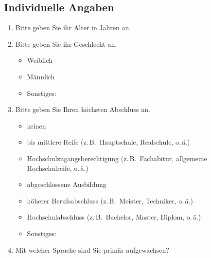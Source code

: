 
\subsection*{Individuelle Angaben}


\begin{enumerate}[resume]
\item \label{App2:IA} Bitte geben Sie ihr Alter in Jahren an.\\
	   \underline{\hspace{7.5cm}}


\item Bitte geben Sie ihr Geschlecht an.

		\begin{itemize}
		\item[\Circle] Weiblich 
        \item[\Circle] Männlich 
        \item[\Circle] Sonstiges:~\underline{\hspace{7.5cm}}
        \end{itemize}
        
        
\item Bitte geben Sie Ihren höchsten Abschluss an.

		\begin{itemize}
        \item[\Circle] keinen
		\item[\Circle] bis mittlere Reife (z.\,B.\ Hauptschule, Realschule, o.\,ä.)
        \item[\Circle] Hochschulzugangsberechtigung (z.\,B.\ Fachabitur, allgemeine Hochschulreife, o.\,ä.)
       	\item[\Circle] abgeschlossene Ausbildung
        \item[\Circle] höherer Berufsabschluss (z.\,B.\ Meister, Techniker, o.\,ä.)
        \item[\Circle] Hochschulabschluss (z.\,B.\ Bachelor, Master, Diplom, o.\,ä.)
        \item[\Circle] Sonstiges:~\underline{\hspace{7.5cm}}
        \end{itemize}


\item Mit welcher Sprache sind Sie primär aufgewachsen?\\
	   \underline{\hspace{7.5cm}}



\end{enumerate}
